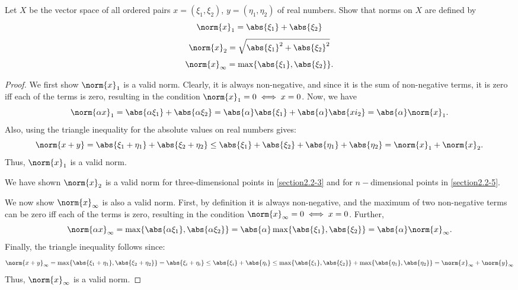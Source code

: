\begin{question}
    Let $X$ be the vector space of all ordered pairs $x = (\xi_1 , \xi_2)$, $y = (\eta_1 , \eta_2)$ of real numbers. Show that norms on $X$ are defined by
    \[\norm{x}_1 = \abs{\xi_1} + \abs{\xi_2}\]
    \[\norm{x}_2 = \sqrt{\abs{\xi_1}^2 + \abs{\xi_2}^2}\]
    \[\norm{x}_\infty = \max\{\abs{\xi_1} , \abs{\xi_2}\}.\]
    \label{section2.2-6}
\end{question}
\begin{proof}
    We first show $\norm{x}_1$ is a valid norm. Clearly, it is always non-negative, and since it is the sum of non-negative terms, it is zero iff each of the terms is zero, resulting in the condition $\norm{x}_1 = 0 \iff x = 0$. Now, we have
    \[\norm{\alpha x}_1 = \abs{\alpha \xi_1} + \abs{\alpha \xi_2} = \abs{\alpha} \abs{\xi_1} + \abs{\alpha}\abs{xi_2} = \abs{\alpha} \norm{x}_{1}.\]
    Also, using the triangle inequality for the absolute values on real numbers gives:
    \[\norm{x + y} = \abs{\xi_1 + \eta_1} + \abs{\xi_2 + \eta_2} \leq \abs{\xi_1} + \abs{\xi_2} + \abs{\eta_1} + \abs{\eta_2} = \norm{x}_1 + \norm{x}_2.\]
    Thus, $\norm{x}_1$ is a valid norm.

    We have shown $\norm{x}_2$ is a valid norm for three-dimensional points in \ref{section2.2-3} and for $n-$dimensional points in \ref{section2.2-5}.

    We now show $\norm{x}_\infty$ is also a valid norm. First, by definition it is always non-negative, and the maximum of two non-negative terms can be zero iff each of the terms is zero, resulting in the condition $\norm{x}_\infty = 0 \iff x = 0$. Further,
    \[\norm{\alpha x}_\infty = \max\{\abs{\alpha \xi_1} , \abs{\alpha \xi_2}\} = \abs{\alpha}\max\{\abs{\xi_1} , \abs{\xi_2}\} = \abs{\alpha} \norm{x}_\infty.\]
    Finally, the triangle inequality follows since:
    \[\norm{x + y}_\infty = \max\{\abs{\xi_1 + \eta_1} , \abs{\xi_2 + \eta_2}\} = \abs{\xi_i + \eta_i} \leq \abs{\xi_i} + \abs{\eta_i} \leq \max\{\abs{\xi_1} , \abs{\xi_2}\} + \max\{\abs{\eta_1} , \abs{\eta_2}\} = \norm{x}_\infty + \norm{y}_\infty\]
    Thus, $\norm{x}_\infty$ is a valid norm.
\end{proof}

